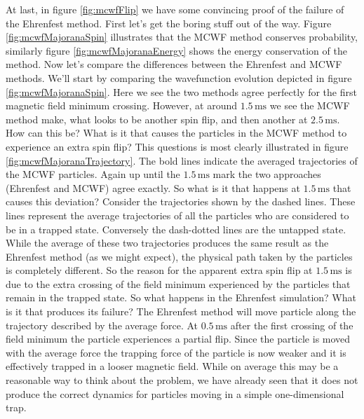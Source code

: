 At last, in figure \ref{fig:mcwfFlip} we have some convincing proof of the failure of the Ehrenfest method.
First let's get the boring stuff out of the way.
Figure \ref{fig:mcwfMajoranaSpin} illustrates that the MCWF method conserves probability, similarly figure \ref{fig:mcwfMajoranaEnergy} shows the energy conservation of the method.
Now let's compare the differences between the Ehrenfest and MCWF methods.
We'll start by comparing the wavefunction evolution depicted in figure \ref{fig:mcwfMajoranaSpin}.
Here we see the two methods agree perfectly for the first magnetic field minimum crossing.
However, at around $1.5\,\mathrm{ms}$ we see the MCWF method make, what looks to be another spin flip, and then another at $2.5\,\mathrm{ms}$.
How can this be?
What is it that causes the particles in the MCWF method to experience an extra spin flip?
This questions is most clearly illustrated in figure \ref{fig:mcwfMajoranaTrajectory}.
The bold lines indicate the averaged trajectories of the MCWF particles.
Again up until the $1.5\,\mathrm{ms}$ mark the two approaches (Ehrenfest and MCWF) agree exactly.
So what is it that happens at $1.5\,\mathrm{ms}$ that causes this deviation?
Consider the trajectories shown by the dashed lines.
These lines represent the average trajectories of all the particles who are considered to be in a trapped state.
Conversely the dash-dotted lines are the untapped state.
While the average of these two trajectories produces the same result as the Ehrenfest method (as we might expect), the physical path taken by the particles is completely different.
So the reason for the apparent extra spin flip at $1.5\,\mathrm{ms}$ is due to the extra crossing of the field minimum experienced by the particles that remain in the trapped state.
So what happens in the Ehrenfest simulation?
What is it that produces its failure?
The Ehrenfest method will move particle along the trajectory described by the average force.
At $0.5\,\mathrm{ms}$ after the first crossing of the field minimum the particle experiences a partial flip.
Since the particle is moved with the average force the trapping force of the particle is now weaker and it is effectively trapped in a looser magnetic field.
While on average this may be a reasonable way to think about the problem, we have already seen that it does not produce the correct dynamics for particles moving in a simple one-dimensional trap.

